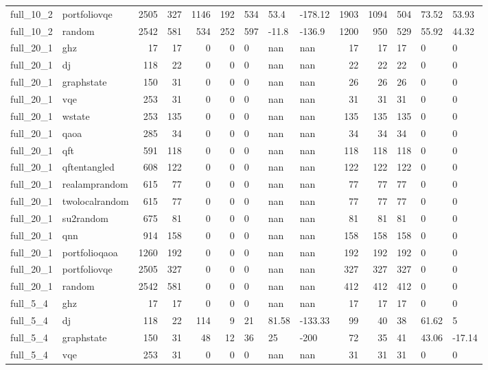 \begin{longtable}{llrrrrlllrrlll}
full\_10\_2 & portfoliovqe & 2505 & 327 & 1146 & 192 & 534 & 53.4 & -178.12 & 1903 & 1094 & 504 & 73.52 & 53.93 \\
full\_10\_2 & random & 2542 & 581 & 534 & 252 & 597 & -11.8 & -136.9 & 1200 & 950 & 529 & 55.92 & 44.32 \\
full\_20\_1 & ghz & 17 & 17 & 0 & 0 & 0 & nan & nan & 17 & 17 & 17 & 0 & 0 \\
full\_20\_1 & dj & 118 & 22 & 0 & 0 & 0 & nan & nan & 22 & 22 & 22 & 0 & 0 \\
full\_20\_1 & graphstate & 150 & 31 & 0 & 0 & 0 & nan & nan & 26 & 26 & 26 & 0 & 0 \\
full\_20\_1 & vqe & 253 & 31 & 0 & 0 & 0 & nan & nan & 31 & 31 & 31 & 0 & 0 \\
full\_20\_1 & wstate & 253 & 135 & 0 & 0 & 0 & nan & nan & 135 & 135 & 135 & 0 & 0 \\
full\_20\_1 & qaoa & 285 & 34 & 0 & 0 & 0 & nan & nan & 34 & 34 & 34 & 0 & 0 \\
full\_20\_1 & qft & 591 & 118 & 0 & 0 & 0 & nan & nan & 118 & 118 & 118 & 0 & 0 \\
full\_20\_1 & qftentangled & 608 & 122 & 0 & 0 & 0 & nan & nan & 122 & 122 & 122 & 0 & 0 \\
full\_20\_1 & realamprandom & 615 & 77 & 0 & 0 & 0 & nan & nan & 77 & 77 & 77 & 0 & 0 \\
full\_20\_1 & twolocalrandom & 615 & 77 & 0 & 0 & 0 & nan & nan & 77 & 77 & 77 & 0 & 0 \\
full\_20\_1 & su2random & 675 & 81 & 0 & 0 & 0 & nan & nan & 81 & 81 & 81 & 0 & 0 \\
full\_20\_1 & qnn & 914 & 158 & 0 & 0 & 0 & nan & nan & 158 & 158 & 158 & 0 & 0 \\
full\_20\_1 & portfolioqaoa & 1260 & 192 & 0 & 0 & 0 & nan & nan & 192 & 192 & 192 & 0 & 0 \\
full\_20\_1 & portfoliovqe & 2505 & 327 & 0 & 0 & 0 & nan & nan & 327 & 327 & 327 & 0 & 0 \\
full\_20\_1 & random & 2542 & 581 & 0 & 0 & 0 & nan & nan & 412 & 412 & 412 & 0 & 0 \\
full\_5\_4 & ghz & 17 & 17 & 0 & 0 & 0 & nan & nan & 17 & 17 & 17 & 0 & 0 \\
full\_5\_4 & dj & 118 & 22 & 114 & 9 & 21 & 81.58 & -133.33 & 99 & 40 & 38 & 61.62 & 5 \\
full\_5\_4 & graphstate & 150 & 31 & 48 & 12 & 36 & 25 & -200 & 72 & 35 & 41 & 43.06 & -17.14 \\
full\_5\_4 & vqe & 253 & 31 & 0 & 0 & 0 & nan & nan & 31 & 31 & 31 & 0 & 0 \\

\end{longtable}
